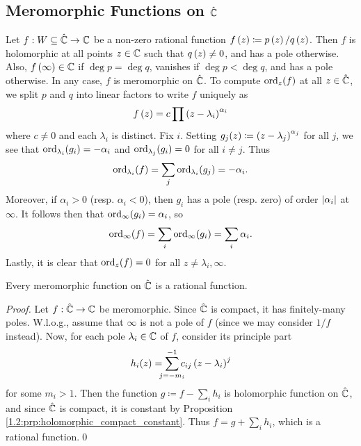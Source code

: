 \documentclass[../Moduli_Spaces_of_Riemann_Surfaces.tex]{subfiles}
\begin{document}
    \subsection{Meromorphic Functions on $\hat{\mathbb{C}}$}
    \begin{example}
        Let $f:W\subseteq\hat{\mathbb{C}}\to\mathbb{C}$ be a non-zero rational function $f\left(z\right)\coloneqq p\left(z\right)/q\left(z\right)$. Then $f$ is holomorphic at all points $z\in\mathbb{C}$ such that $q\left(z\right)\neq0$, and has a pole otherwise. Also, $f\left(\infty\right)\in\mathbb{C}$ if $\deg p=\deg q$, vanishes if $\deg p<\deg q$, and has a pole otherwise. In any case, $f$ is meromorphic on $\hat{\mathbb{C}}$. To compute $\operatorname{ord}_z\!\left(f\right)$ at all $z\in\hat{\mathbb{C}}$, we split $p$ and $q$ into linear factors to write $f$ uniquely as
        \begin{equation*}
            f\left(z\right)=c\prod\left(z-\lambda_i\right)^{\alpha_i}
        \end{equation*}
        where $c\neq0$ and each $\lambda_i$ is distinct. Fix $i$. Setting $g_j\!\left(z\right)\coloneqq\left(z-\lambda_j\right)^{\alpha_j}$ for all $j$, we see that $\operatorname{ord}_{\lambda_i}\!\left(g_i\right)=-\alpha_i$ and $\operatorname{ord}_{\lambda_j}\!\left(g_i\right)=0$ for all $i\neq j$. Thus
        \begin{equation*}
            \operatorname{ord}_{\lambda_i}\!\left(f\right)=\sum_j\operatorname{ord}_{\lambda_i}\!\left(g_j\right)=-\alpha_i.
        \end{equation*}
        Moreover, if $\alpha_i>0$ (resp. $\alpha_i<0$), then $g_i$ has a pole (resp. zero) of order $\left|\alpha_i\right|$ at $\infty$. It follows then that $\operatorname{ord}_\infty\!\left(g_i\right)=\alpha_i$, so
        \begin{equation*}
            \operatorname{ord}_\infty\!\left(f\right)=\sum_i\operatorname{ord}_\infty\!\left(g_i\right)=\sum_i\alpha_i.
        \end{equation*}
        Lastly, it is clear that $\operatorname{ord}_z\!\left(f\right)=0$ for all $z\neq \lambda_i,\infty$.\exqed
    \end{example}
    \begin{proposition}\label{1.2:prp:meromorphic_Riemann_sphere_rational}
        Every meromorphic function on $\hat{\mathbb{C}}$ is a rational function.
    \end{proposition}
    \begin{proof}
        Let $f:\hat{\mathbb{C}}\to\mathbb{C}$ be meromorphic. Since $\hat{\mathbb{C}}$ is compact, it has finitely-many poles. W.l.o.g., assume that $\infty$ is not a pole of $f$ (since we may consider $1/f$ instead). Now, for each pole $\lambda_i\in\mathbb{C}$ of $f$, consider its principle part
        \begin{equation*}
            h_i\!\l(z\r)=\sum_{\mathclap{j=-m_i}}^{-1}c_{ij}\l(z-\lambda_i\r)^j
        \end{equation*}
        for some $m_i>1$. Then the function $g\coloneqq f-\sum_ih_i$ is holomorphic function on $\hat{\mathbb{C}}$, and since $\hat{\mathbb{C}}$ is compact, it is constant by Proposition \ref{1.2:prp:holomorphic_compact_constant}. Thus $f=g+\sum_ih_i$, which is a rational function.\qed
    \end{proof}
\end{document}
